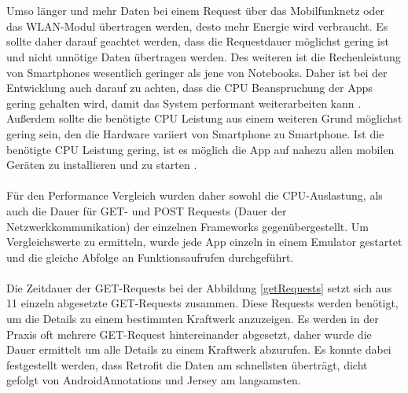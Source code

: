 \\\\
Umso länger und mehr Daten bei einem Request über das Mobilfunknetz oder das WLAN-Modul übertragen werden, desto mehr Energie wird verbraucht. Es sollte daher darauf geachtet werden, dass die Requestdauer möglichst gering ist und nicht unnötige Daten übertragen werden. Des weiteren ist die Rechenleistung von Smartphones  wesentlich geringer als jene von Notebooks. Daher ist bei der Entwicklung auch darauf zu achten, dass die CPU Beanspruchung der Apps gering gehalten wird, damit das System performant weiterarbeiten kann \cite{mittal:energy}. Außerdem sollte die benötigte CPU Leistung aus einem weiteren Grund möglichst gering sein, den die Hardware variiert von Smartphone zu Smartphone. Ist die benötigte CPU Leistung gering, ist es möglich die App auf nahezu allen mobilen Geräten zu installieren und zu starten \cite{joorabchi:challenges}. 
\\\\
Für den Performance Vergleich wurden daher sowohl die CPU-Auslastung, als auch die Dauer für GET- und POST Requests (Dauer der Netzwerkkommunikation) der einzelnen Frameworks gegenübergestellt. Um Vergleichswerte zu ermitteln, wurde jede App einzeln in einem Emulator gestartet und die gleiche Abfolge an Funktionsaufrufen durchgeführt. 
\\\\
Die Zeitdauer der GET-Requests bei der Abbildung \ref{getRequests} setzt sich aus 11 einzeln abgesetzte GET-Requests zusammen. Diese Requests werden benötigt, um die Details zu einem bestimmten Kraftwerk anzuzeigen. Es werden in der Praxis oft mehrere GET-Request hintereinander abgesetzt, daher wurde die Dauer ermittelt um alle Details zu einem Kraftwerk abzurufen. Es konnte dabei festgestellt werden, dass Retrofit die Daten am schnellsten überträgt, dicht gefolgt von AndroidAnnotations und Jersey am langsamsten. 

